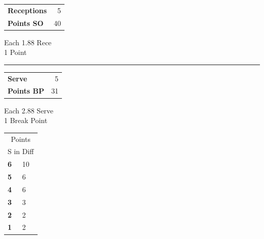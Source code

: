 \documentclass[a4paper,10pt]{scrartcl}
\begin{document}
\begin{minipage}{0.95\linewidth}
\begin{minipage}{0.48\linewidth}
{\begin{tabular}{l l l l | r r r r}
      \end{tabular}
    }
  \end{minipage}
  \begin{minipage}{0.16\linewidth}
    {\normalsize
      \begin{tabular}{l r}
        \textbf{Receptions} & 5 \\
        \textbf{Points SO}  & 40 \\
      \end{tabular}
      \begin{center}
        Each 1.88 Rece\\
        1 Point
      \end{center}
      \noindent\rule{\textwidth}{1pt}
      \begin{tabular}{l r}
        \textbf{Serve}     & 5 \\
        \textbf{Points BP} & 31 \\
      \end{tabular}
      \begin{center}
        Each 2.88 Serve\\
        1 Break Point
      \end{center}
    }
  \end{minipage}
  \begin{minipage}{0.01\textwidth}
    \begin{tabular}{l l}
      \multicolumn{2}{c}{
        Points }                    \\
      \multicolumn{2}{c}{S in Diff} \\
      \midrule

      \textbf{ 6 } & 10 \\

      \textbf{ 5 } & 6 \\

      \textbf{ 4 } & 6 \\

      \textbf{ 3 } & 3 \\

      \textbf{ 2 } & 2 \\

      \textbf{ 1 } & 2 \\

    \end{tabular}
  \end{minipage}
\end{minipage}
\end{document}
